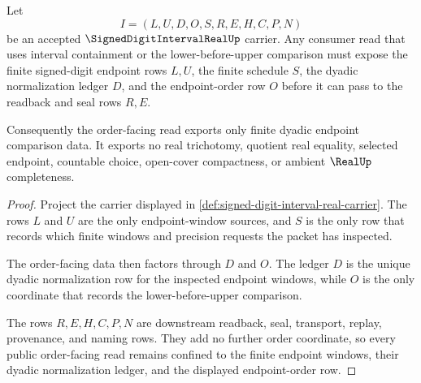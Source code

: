 \begin{theorem}
\label{thm:signed-digit-interval-real-endpoint-order-nonescape}
Let
$$
I=(L,U,D,O,S,R,E,H,C,P,N)
$$
be an accepted $\SignedDigitIntervalRealUp$ carrier. Any consumer read that uses interval containment or the lower-before-upper comparison must expose the finite signed-digit endpoint rows $L,U$, the finite schedule $S$, the dyadic normalization ledger $D$, and the endpoint-order row $O$ before it can pass to the readback and seal rows $R,E$.

Consequently the order-facing read exports only finite dyadic endpoint comparison data. It exports no real trichotomy, quotient real equality, selected endpoint, countable choice, open-cover compactness, or ambient $\RealUp$ completeness.
\end{theorem}
\begin{proof}
Project the carrier displayed in \autoref{def:signed-digit-interval-real-carrier}. The rows $L$ and $U$ are the only endpoint-window sources, and $S$ is the only row that records which finite windows and precision requests the packet has inspected.

The order-facing data then factors through $D$ and $O$. The ledger $D$ is the unique dyadic normalization row for the inspected endpoint windows, while $O$ is the only coordinate that records the lower-before-upper comparison.

The rows $R,E,H,C,P,N$ are downstream readback, seal, transport, replay, provenance, and naming rows. They add no further order coordinate, so every public order-facing read remains confined to the finite endpoint windows, their dyadic normalization ledger, and the displayed endpoint-order row.
\end{proof}


